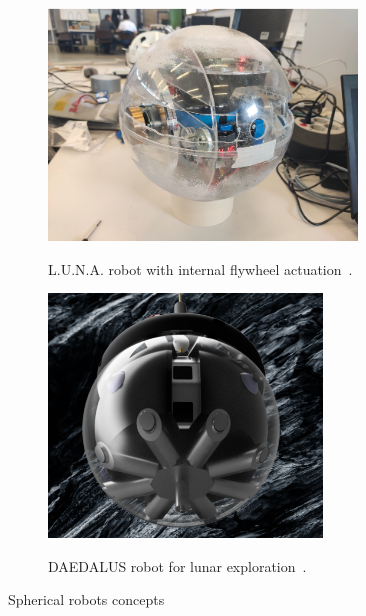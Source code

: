 \documentclass[english, bachelor, utf8]{base/thesis_telematics}
\begin{document}
\begin{figure}[h]
    \centering
\begin{subfigure}{0.48\textwidth}
    \centering
    \includegraphics[width=0.9\textwidth]{pics/luna.png}
    \label{fig:luna_flywheel}
    \caption{L.U.N.A. robot with internal flywheel actuation~\cite{luna}.}
\end{subfigure}
\hfill
\begin{subfigure}{0.48\textwidth}
    \centering
    \includegraphics[width=0.8\textwidth]{pics/DAEDALUS.png}
    \label{fig:daedalus}
    \caption{DAEDALUS robot for lunar exploration~\cite{esa_lunar_cave_explorer}.}
\end{subfigure}
\label{fig:spherical_robots}
\caption{Spherical robots concepts}
\end{figure}
\end{document}
